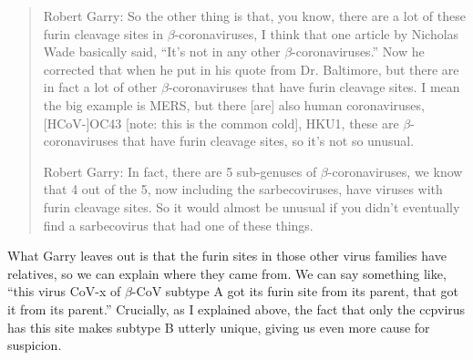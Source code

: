 \documentclass[11pt]{article}
\begin{document}
\begin{quote}
Robert Garry: So the other thing is that, you know, there are a lot of these furin cleavage sites in \(\beta\)-coronaviruses, I think that one article by Nicholas Wade basically said, ``It's not in any other \(\beta\)-coronaviruses.'' Now he corrected that when he put in his quote from Dr. Baltimore, but there are in fact a lot of other \(\beta\)-coronaviruses that have furin cleavage sites. I mean the big example is MERS, but there [are] also human coronaviruses, [HCoV-]OC43 [note: this is the common cold], HKU1, these are \(\beta\)-coronaviruses that have furin cleavage sites, so it's not so unusual.

Robert Garry: In fact, there are 5 sub-genuses of \(\beta\)-coronaviruses, we know that 4 out of the 5, now including the sarbecoviruses, have viruses with furin cleavage sites. So it would almost be unusual if you didn't eventually find a sarbecovirus that had one of these things.
\end{quote}
What Garry leaves out is that the furin sites in those other virus families have relatives, so we can explain where they came from. We can say something like, ``this virus CoV-x of \(\beta\)-CoV subtype A got its furin site from its parent, that got it from its parent.'' Crucially, as I explained above, the fact that only the ccpvirus has this site makes subtype B utterly unique, giving us even more cause for suspicion.
\end{document}
